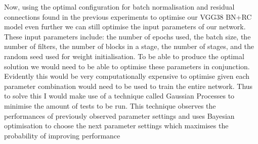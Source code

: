 {{Now, using the optimal configuration for batch normalisation and residual connections found in the previous experiments to optimise our VGG38 BN+RC model even further we can still optimise the input parameters of our network. These input parameters include: the number of epochs used, the batch size, the number of filters, the number of blocks in a stage, the number of stages, and the random seed used for weight initialisation. To be able to produce the optimal solution we would need to be able to optimise these parameters in conjunction. Evidently this would be very computationally expensive to optimise given each parameter combination would need to be used to train the entire network. Thus to solve this I would make use of a technique called Gaussian Processes to minimise the amount of tests to be run. This technique observes the performances of previously observed parameter settings and uses Bayesian optimisation to choose the next parameter settings which maximises the probability of improving performance
%
%
%
}
}

